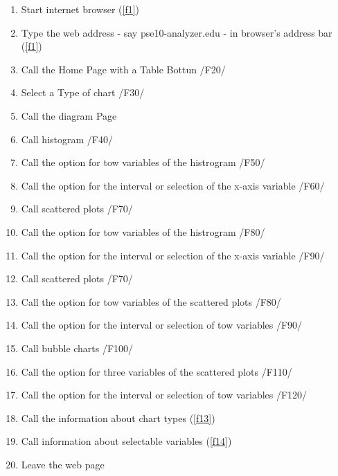 \begin{enumerate}


\item Start internet browser (\ref{f1})

\item Type the web address - say pse10-analyzer.edu - in browser's address bar (\ref{f1})

\item Call the Home Page with a Table Bottun /F20/ %

\item Select a Type of chart /F30/

\item Call the diagram Page 

\item Call histogram /F40/

\item Call the option for tow variables of the histrogram /F50/

\item Call the option for the interval or selection of the x-axis variable /F60/

\item Call  scattered plots  /F70/

\item Call the option for tow variables of the histrogram /F80/

\item Call the option for the interval or selection of the x-axis variable /F90/

\item Call  scattered plots  /F70/

\item Call the option for tow variables of the scattered plots /F80/

\item Call the option for the interval or selection of tow variables /F90/

\item Call bubble charts /F100/

\item Call the option for three variables of the scattered plots /F110/

\item Call the option for the interval or selection of tow variables /F120/

\item Call the information about chart types (\ref{f13})

\item Call information about selectable variables (\ref{f14})

\item Leave the web page

\end{enumerate}




